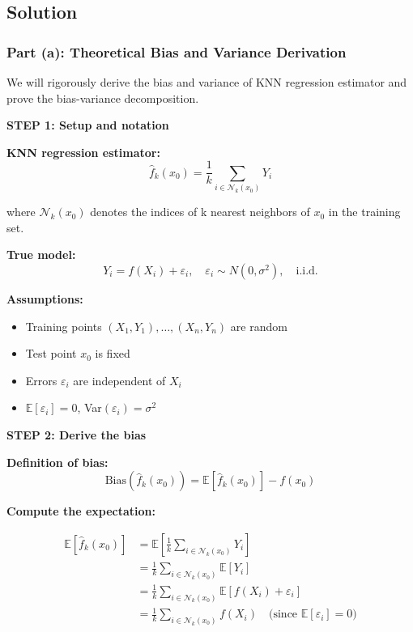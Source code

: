 \documentclass[12pt]{article}
\begin{document}
\hrulefill

\subsection{Solution}

\subsubsection{Part (a): Theoretical Bias and Variance Derivation}

\begin{solution}
We will rigorously derive the bias and variance of KNN regression estimator and prove the bias-variance decomposition.

\textbf{STEP 1: Setup and notation}

\textbf{KNN regression estimator:}
\[
\hat{f}_k(x_0) = \frac{1}{k}\sum_{i \in \mathcal{N}_k(x_0)} Y_i
\]

where $\mathcal{N}_k(x_0)$ denotes the indices of k nearest neighbors of $x_0$ in the training set.

\textbf{True model:}
\[
Y_i = f(X_i) + \varepsilon_i, \quad \varepsilon_i \sim N(0, \sigma^2), \quad \text{i.i.d.}
\]

\textbf{Assumptions:}
\begin{itemize}
    \item Training points $(X_1, Y_1), \ldots, (X_n, Y_n)$ are random
    \item Test point $x_0$ is fixed
    \item Errors $\varepsilon_i$ are independent of $X_i$
    \item $\mathbb{E}[\varepsilon_i] = 0$, Var$(\varepsilon_i) = \sigma^2$
\end{itemize}

\textbf{STEP 2: Derive the bias}

\textbf{Definition of bias:}
\[
\text{Bias}(\hat{f}_k(x_0)) = \mathbb{E}[\hat{f}_k(x_0)] - f(x_0)
\]

\textbf{Compute the expectation:}

\begin{align*}
\mathbb{E}[\hat{f}_k(x_0)] &= \mathbb{E}\left[\frac{1}{k}\sum_{i \in \mathcal{N}_k(x_0)} Y_i\right] \\
&= \frac{1}{k}\sum_{i \in \mathcal{N}_k(x_0)} \mathbb{E}[Y_i] \\
&= \frac{1}{k}\sum_{i \in \mathcal{N}_k(x_0)} \mathbb{E}[f(X_i) + \varepsilon_i] \\
&= \frac{1}{k}\sum_{i \in \mathcal{N}_k(x_0)} f(X_i) \quad \text{(since } \mathbb{E}[\varepsilon_i] = 0\text{)}
\end{align*}


\end{solution}
\end{document}
